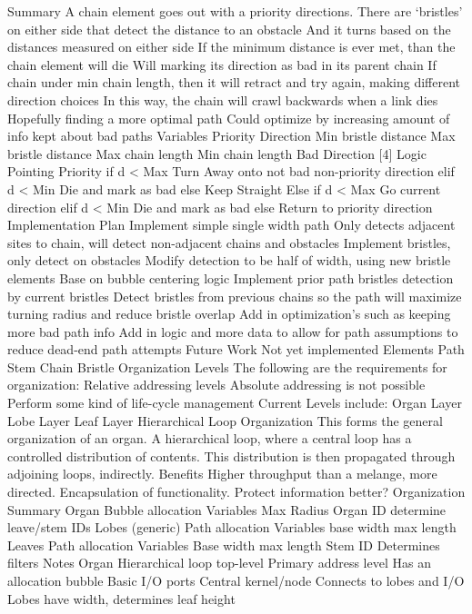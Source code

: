 \documentclass[article]{memoir}
\begin{document}
Summary
A chain element goes out with a priority directions.
There are ‘bristles’ on either side that detect the distance to an obstacle
And it turns based on the distances measured on either side
If the minimum distance is ever met, than the chain element will die
Will marking its direction as bad in its parent chain
If chain under min chain length, then it will retract and try again, making different direction choices
In this way, the chain will crawl backwards when a link dies
Hopefully finding a more optimal path
Could optimize by increasing amount of info kept about bad paths
Variables
Priority Direction
Min bristle distance
Max bristle distance
Max chain length
Min chain length
Bad Direction [4]
Logic
Pointing Priority
if d < Max
Turn Away onto not bad non-priority direction
elif d < Min
Die and mark as bad
else
Keep Straight
Else
if d < Max
Go current direction
elif d < Min
Die and mark as bad
else
Return to priority direction
Implementation Plan
Implement simple single width path
Only detects adjacent sites to chain, will detect non-adjacent chains and obstacles
Implement bristles, only detect on obstacles
Modify detection to be half of width, using new bristle elements Base on bubble centering logic
Implement prior path bristles detection by current bristles
Detect bristles from previous chains so the path will maximize turning radius and reduce bristle overlap
Add in optimization’s such as keeping more bad path info
Add in logic and more data to allow for path assumptions to reduce dead-end path attempts
Future Work
Not yet implemented
Elements
Path Stem
Chain
Bristle
Organization Levels
The following are the requirements for organization:
Relative addressing levels
Absolute addressing is not possible
Perform some kind of life-cycle management
Current Levels include:
Organ Layer
Lobe Layer
Leaf Layer
Hierarchical Loop Organization
This forms the general organization of an organ. A hierarchical loop, where a central loop has a controlled distribution of contents. This distribution is then propagated through adjoining loops, indirectly.
Benefits
Higher throughput than a melange, more directed. Encapsulation of functionality. Protect information better?
Organization Summary
Organ
Bubble allocation
Variables
Max Radius
Organ ID
determine leave/stem IDs
Lobes (generic)
Path allocation
Variables
base width
max length
Leaves
Path allocation
Variables
Base width
max length
Stem ID
Determines filters
Notes
Organ
Hierarchical loop top-level
Primary address level
Has an allocation bubble
Basic I/O ports
Central kernel/node
Connects to lobes and I/O
Lobes have width, determines leaf height
\end{document}
